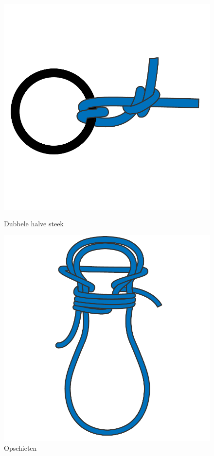 \begin{figure}[h]
\begin{minipage}[b]{0.32\textwidth}
    \includegraphics[width=\textwidth]{Hoofdstukken/Schiemannen/pdf/dubble_halve_steek.pdf}
    \caption{Dubbele halve steek}
    \label{pic:dub_halve_steek}
    \end{minipage}
  \hfill
   \begin{minipage}[b]{0.32\textwidth}
    \centering
    \includegraphics[width=\textwidth]{Hoofdstukken/Schiemannen/pdf/opbossen.pdf}
    \caption{Opschieten}
    \label{pic:opschieten}
    \end{minipage}
\end{figure}
\newpage
